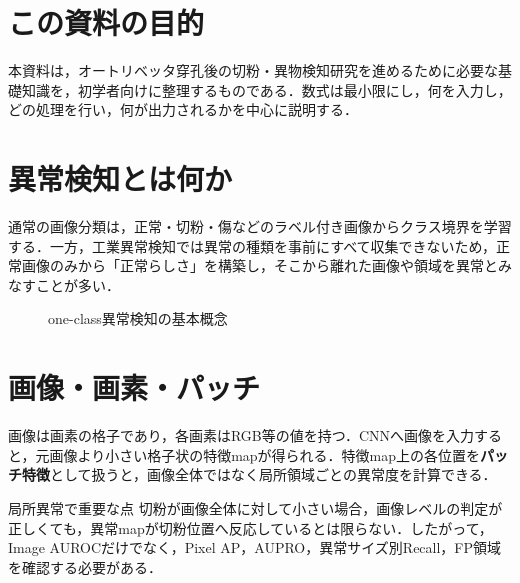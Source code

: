 \documentclass[a4paper,11pt]{ltjsarticle}
\begin{document}

\section{この資料の目的}
本資料は，オートリベッタ穿孔後の切粉・異物検知研究を進めるために必要な基礎知識を，初学者向けに整理するものである．数式は最小限にし，何を入力し，どの処理を行い，何が出力されるかを中心に説明する．

\section{異常検知とは何か}
通常の画像分類は，正常・切粉・傷などのラベル付き画像からクラス境界を学習する．一方，工業異常検知では異常の種類を事前にすべて収集できないため，正常画像のみから「正常らしさ」を構築し，そこから離れた画像や領域を異常とみなすことが多い．

\begin{figure}[H]
\centering
{}
\caption{one-class異常検知の基本概念}
\end{figure}

\section{画像・画素・パッチ}
画像は画素の格子であり，各画素はRGB等の値を持つ．CNNへ画像を入力すると，元画像より小さい格子状の特徴mapが得られる．特徴map上の各位置を\textbf{パッチ特徴}として扱うと，画像全体ではなく局所領域ごとの異常度を計算できる．

\begin{KhiBox}{局所異常で重要な点}
切粉が画像全体に対して小さい場合，画像レベルの判定が正しくても，異常mapが切粉位置へ反応しているとは限らない．したがって，Image AUROCだけでなく，Pixel AP，AUPRO，異常サイズ別Recall，FP領域を確認する必要がある．
\end{KhiBox}
\end{document}
